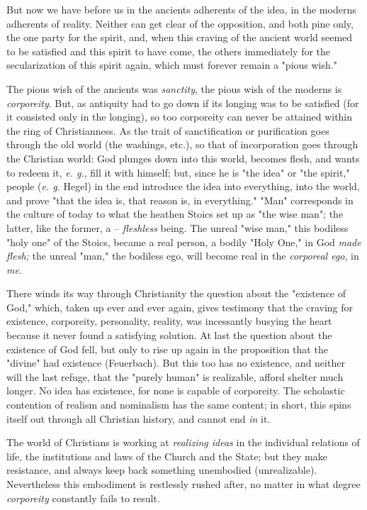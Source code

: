 \documentclass[a4paper]{book}
\begin{document}
But now we have before us in the ancients adherents of the idea, in the 
moderns adherents of reality. Neither can get clear of the opposition, and 
both pine only, the one party for the spirit, and, when this craving of the 
ancient world seemed to be satisfied and this spirit to have come, the others 
immediately for the secularization of this spirit again, which must forever 
remain a "{}pious wish."{}

The pious wish of the ancients was \textit{sanctity}, the pious wish of the 
moderns is \textit{corporeity}. But, as antiquity had to go down if its 
longing was to be satisfied (for it consisted only in the longing), so too 
corporeity can never be attained within the ring of Christianness. As the 
trait of sanctification or purification goes through the old world (the 
washings, etc.), so that of incorporation goes through the Christian world: 
God plunges down into this world, becomes flesh, and wants to redeem it, 
\textit{e. g.}, fill it with himself; but, since he is "{}the idea"{} or 
"{}the spirit,"{} people (\textit{e. g.} Hegel) in the end introduce the idea 
into everything, into the world, and prove "{}that the idea is, that reason 
is, in everything."{} "{}Man"{} corresponds in the culture of today to what 
the heathen Stoics set up as "{}the wise man"{}; the latter, like the former, 
a -- \textit{fleshless} being. The unreal "{}wise man,"{} this bodiless 
"{}holy one"{} of the Stoics, became a real person, a bodily "{}Holy One,"{} 
in God \textit{made flesh;} the unreal "{}man,"{} the bodiless ego, will 
become real in the \textit{corporeal ego}, in \textit{me}.

There winds its way through Christianity the question about the "{}existence 
of God,"{} which, taken up ever and ever again, gives testimony that the 
craving for existence, corporeity, personality, reality, was incessantly 
busying the heart because it never found a satisfying solution. At last the 
question about the existence of God fell, but only to rise up again in the 
proposition that the "{}divine"{} had existence (Feuerbach). But this too has 
no existence, and neither will the last refuge, that the "{}purely human"{} is 
realizable, afford shelter much longer. No idea has existence, for none is 
capable of corporeity. The scholastic contention of realism and nominalism has 
the same content; in short, this spins itself out through all Christian 
history, and cannot end \textit{in} it.

The world of Christians is working at \textit{realizing ideas} in the 
individual relations of life, the institutions and laws of the Church and the 
State; but they make resistance, and always keep back something unembodied 
(unrealizable). Nevertheless this embodiment is restlessly rushed after, no 
matter in what degree \textit{corporeity} constantly fails to result.
\end{document}
